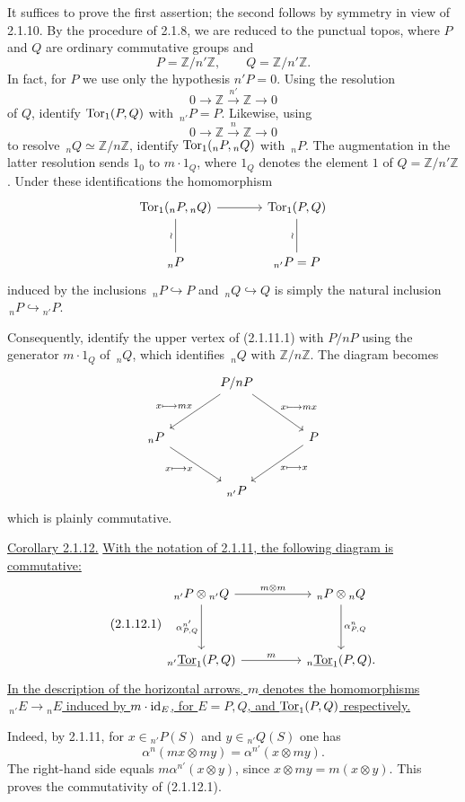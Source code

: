 \medskip
It suffices to prove the first assertion; the second follows by
symmetry in view of 2.1.10.  By the procedure of 2.1.8, we are reduced
to the punctual topos, where $P$ and $Q$ are ordinary commutative
groups and
\[
 P=\mathbb Z/n'\mathbb Z,\qquad Q=\mathbb Z/n'\mathbb Z.
\]
In fact, for $P$ we use only the hypothesis $n'P=0$.  Using the
resolution
\[
 0\longrightarrow\mathbb Z\xrightarrow{n'}\mathbb Z
 \longrightarrow0
\]
of $Q$, identify $\operatorname{Tor}_1(P,Q)$ with $\,{}_{n'}P=P$.  Likewise, using
\[
 0\longrightarrow\mathbb Z\xrightarrow n\mathbb Z
 \longrightarrow0
\]
to resolve
$\,{}_nQ\simeq\mathbb Z/n\mathbb Z$, identify
$\operatorname{Tor}_1({}_nP,{}_nQ)$ with $\,{}_nP$.  The augmentation in the latter
resolution sends $1_0$ to $m\cdot1_Q$, where $1_Q$ denotes the element
$1$ of $Q=\mathbb Z/n'\mathbb Z$.  Under these identifications the
homomorphism
\[
\begin{tikzcd}[column sep=large,row sep=large]
 \Tor_1({}_nP,{}_nQ)\arrow[r]\arrow[d,no head,"\wr"']&
 \Tor_1(P,Q)\arrow[d,no head,"\wr"']\\
 {}_nP&{}_{n'}P=P
\end{tikzcd}
\]
induced by the inclusions
$\,{}_nP\hookrightarrow P$ and $\,{}_nQ\hookrightarrow Q$ is simply
the natural inclusion $\,{}_nP\hookrightarrow{}_{n'}P$.

Consequently, identify the upper vertex of (2.1.11.1) with $P/nP$
using the generator $m\cdot1_Q$ of $\,{}_nQ$, which identifies
$\,{}_nQ$ with $\mathbb Z/n\mathbb Z$.  The diagram becomes
\[
\begin{tikzcd}[column sep=large,row sep=large]
 &P/nP
   \arrow[ld,"x\longmapsto mx"']
   \arrow[rd,"x\longmapsto mx"]&\\
 {}_nP\arrow[rd,"x\longmapsto x"']&&
 P\arrow[ld,"x\longmapsto x"]\\
 &{}_{n'}P&
\end{tikzcd}
\]
which is plainly commutative.

\medskip
\noindent\underline{Corollary 2.1.12.}
\underline{With the notation of 2.1.11, the following diagram is
commutative:}
\begin{equation}\tag{2.1.12.1}
\begin{tikzcd}[column sep=huge,row sep=huge]
 {}_{n'}P\otimes{}_{n'}Q
   \arrow[r,"m\otimes m"]
   \arrow[d,"{\alpha^{n'}_{P,Q}}"']&
 {}_nP\otimes{}_nQ
   \arrow[d,"{\alpha^n_{P,Q}}"]\\
 {}_{n'}\uTor_1(P,Q)
   \arrow[r,"m"]&
 {}_n\uTor_1(P,Q).
\end{tikzcd}
\end{equation}
\underline{In the description of the horizontal arrows, $m$ denotes
the homomorphisms $\,{}_{n'}E\longrightarrow{}_nE$ induced by
$m\cdot\mathrm{id}_E$, for $E=P,Q$, and $\uTor_1(P,Q)$ respectively.}

\medskip
Indeed, by 2.1.11, for
$x\in{}_{n'}P(S)$ and $y\in{}_{n'}Q(S)$ one has
\[
 \alpha^n(mx\otimes my)=\alpha^{n'}(x\otimes my).
\]
The right-hand side equals
$m\alpha^{n'}(x\otimes y)$, since
$x\otimes my=m(x\otimes y)$.  This proves the commutativity of
(2.1.12.1).
